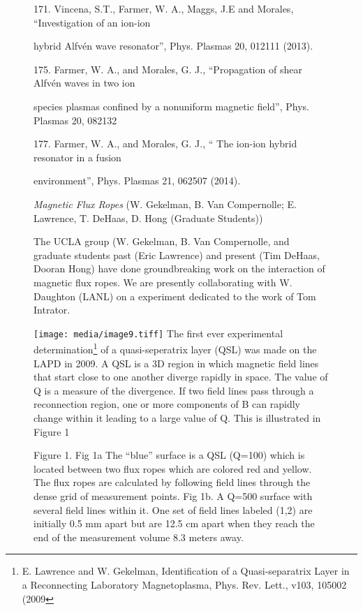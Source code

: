 \documentclass[11pt]{article}
\begin{document}
\begin{description}
\begin{figure}[!htbp]
171. Vincena, S.T., Farmer, W. A., Maggs, J.E and Morales,
``Investigation of an ion-ion

hybrid Alfvén wave resonator'', Phys. Plasmas 20, 012111 (2013).

175. Farmer, W. A., and Morales, G. J., ``Propagation of shear Alfvén
waves in two ion

species plasmas confined by a nonuniform magnetic field'', Phys. Plasmas
20, 082132

177. Farmer, W. A., and Morales, G. J., `` The ion-ion hybrid resonator
in a fusion

environment'', Phys. Plasmas 21, 062507 (2014).


\emph{Magnetic Flux Ropes} (W. Gekelman, B. Van Compernolle; E.
Lawrence, T. DeHaas, D. Hong (Graduate Students))

The UCLA group (W. Gekelman, B. Van Compernolle, and graduate students
past (Eric Lawrence) and present (Tim DeHaas, Dooran Hong) have done
groundbreaking work on the interaction of magnetic flux ropes. We are
presently collaborating with W. Daughton (LANL) on a experiment
dedicated to the work of Tom Intrator.

\texttt{[image: media/image9.tiff]} The first ever experimental
determination\footnote{E. Lawrence and W. Gekelman, Identification of a
  Quasi-separatrix Layer in a Reconnecting Laboratory Magnetoplasma,
  Phys. Rev. Lett., v103, 105002 (2009} of a quasi-seperatrix layer
(QSL) was made on the LAPD in 2009. A QSL is a 3D region in which
magnetic field lines that start close to one another diverge rapidly in
space. The value of Q is a measure of the divergence. If two field lines
pass through a reconnection region, one or more components of B can
rapidly change within it leading to a large value of Q. This is
illustrated in Figure 1

Figure 1. Fig 1a The ``blue'' surface is a QSL (Q=100) which is located
between two flux ropes which are colored red and yellow. The flux ropes
are calculated by following field lines through the dense grid of
measurement points. Fig 1b. A Q=500 surface with several field lines
within it. One set of field lines labeled (1,2) are initially 0.5 mm
apart but are 12.5 cm apart when they reach the end of the measurement
volume 8.3 meters away.


\end{figure}
\end{description}
\end{document}
